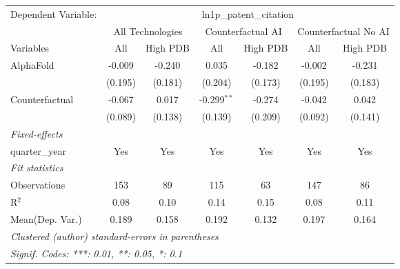 \begingroup
\centering
\begin{tabular}{lcccccc}
   \tabularnewline \midrule \midrule
   Dependent Variable: & \multicolumn{6}{c}{ln1p\_patent\_citation}\\
 & \multicolumn{2}{c}{All Technologies} & \multicolumn{2}{c}{Counterfactual AI} & \multicolumn{2}{c}{Counterfactual No AI} \\
\cmidrule(lr){1-1}\cmidrule(lr){2-3} \cmidrule(lr){4-5} \cmidrule(lr){6-7}
Variables & \multicolumn{1}{c}{All} & \multicolumn{1}{c}{High PDB} & \multicolumn{1}{c}{All} & \multicolumn{1}{c}{High PDB} & \multicolumn{1}{c}{All} & \multicolumn{1}{c}{High PDB} \\
\cmidrule(lr){1-1}\cmidrule(lr){2-2} \cmidrule(lr){3-3} \cmidrule(lr){4-4} \cmidrule(lr){5-5} \cmidrule(lr){6-6} \cmidrule(lr){7-7}
   AlphaFold      & -0.009  & -0.240  & 0.035         & -0.182  & -0.002  & -0.231\\   
                  & (0.195) & (0.181) & (0.204)       & (0.173) & (0.195) & (0.183)\\   
   Counterfactual & -0.067  & 0.017   & -0.299$^{**}$ & -0.274  & -0.042  & 0.042\\   
                  & (0.089) & (0.138) & (0.139)       & (0.209) & (0.092) & (0.141)\\   
   \midrule
   \emph{Fixed-effects}\\
   quarter\_year  & Yes     & Yes     & Yes           & Yes     & Yes     & Yes\\  
   \midrule
   \emph{Fit statistics}\\
   Observations   & 153     & 89      & 115           & 63      & 147     & 86\\  
   R$^2$          & 0.08    & 0.10    & 0.14          & 0.15    & 0.08    & 0.11\\  
Mean(Dep. Var.) & 0.189 & 0.158 & 0.192 & 0.132 & 0.197 & 0.164 \\
   \midrule \midrule
   \multicolumn{7}{l}{\emph{Clustered (author) standard-errors in parentheses}}\\
   \multicolumn{7}{l}{\emph{Signif. Codes: ***: 0.01, **: 0.05, *: 0.1}}\\
\end{tabular}
\par\endgroup
